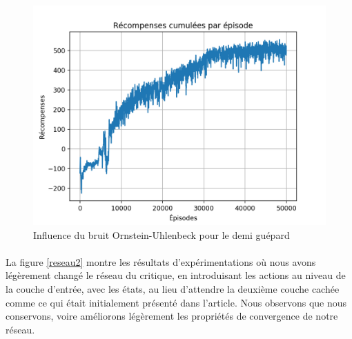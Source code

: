 \documentclass[letterpaper, french]{article}
\begin{document}
\begin{figure}
\begin{center}
\includegraphics[scale=0.5]{assiettes/halfCheetah_ornstein-uhlenbeck.png}
\caption{Influence du bruit Ornstein-Uhlenbeck pour le demi guépard}
\label{fig7}
\end{center}
\end{figure}


\paragraph{}
La figure \ref{reseau2} montre les résultats d'expérimentations où nous avons légèrement changé le réseau du critique, en introduisant les actions au niveau de la couche d'entrée, avec les états, au lieu d'attendre la deuxième couche cachée comme ce qui était initialement présenté dans l'article. Nous observons que nous conservons, voire améliorons légèrement les propriétés de convergence de notre réseau. 
\end{document}
